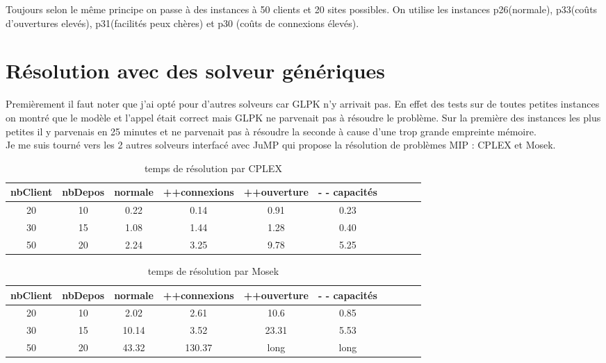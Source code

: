 \documentclass[12pt,a4paper]{article}
\begin{document}
Toujours selon le même principe on passe à des instances à 50 clients et 20 sites possibles. On utilise les instances p26(normale), p33(coûts d'ouvertures elevés), p31(facilités peux chères) et p30 (coûts de connexions élevés).\\

\section{Résolution avec des solveur génériques}

Premièrement il faut noter que j'ai opté pour d'autres solveurs car GLPK n'y arrivait pas. En effet des tests sur de toutes petites instances on montré que le modèle et l'appel était correct mais GLPK ne parvenait pas à résoudre le problème. Sur la première des instances les plus petites il y parvenais en 25 minutes et ne parvenait pas à résoudre la seconde à cause d'une trop grande empreinte mémoire.\\

Je me suis tourné vers les 2 autres solveurs interfacé avec JuMP qui propose la résolution de problèmes MIP : CPLEX et Mosek.\\

\begin{table}[!h]
\centering
\begin{tabular}{|*{10}{c|}}
  \hline
  nbClient & nbDepos & normale & ++connexions & ++ouverture & - - capacités \\
  \hline
	20 & 10 & 0.22 & 0.14 & 0.91 & 0.23 \\
	30 & 15 & 1.08 & 1.44 & 1.28 & 0.40 \\
	50 & 20 & 2.24 & 3.25 & 9.78 & 5.25 \\
  \hline
\end{tabular}
\caption{temps de résolution par CPLEX}
\label{tempsCPLEX}
\end{table}

\begin{table}[!h]
\centering
\begin{tabular}{|*{10}{c|}}
  \hline
  nbClient & nbDepos & normale & ++connexions & ++ouverture & - - capacités \\
  \hline
	20 & 10 & 2.02 & 2.61 & 10.6 & 0.85 \\
	30 & 15 & 10.14 & 3.52 & 23.31 & 5.53 \\
	50 & 20 & 43.32 & 130.37 & long & long \\
  \hline
\end{tabular}
\caption{temps de résolution par Mosek}
\label{tempsCPLEX}
\end{table}
\end{document}

